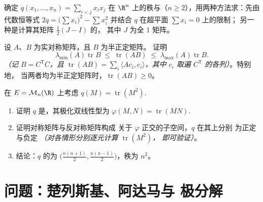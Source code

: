 \begin{exercise}[$\star\star$]\label{exo:b2:quadratic:10}
确定 $q(x_1, \dots, x_n) = \sum_{i <
j} x_ix_j$ 在 $\R^n$ 上的秩与（$n \geq 2$），用两种方法求：先由代数恒等式
$2q = \bigl(\sum x_i\bigr)^2 - \sum x_i^2$ 并结合
$q$ 在超平面 $\sum x_i = 0$ 上的限制；
另一种是计算其矩阵 $\frac12(J - I)$ 的，
其中 $J$ 为全 1 矩阵。
\end{exercise}

\begin{exercise}[$\star\star$]\label{exo:b2:quadratic:11}
设 $A$、$B$ 为实对称矩阵，且 $B$ 为半正定矩阵。
证明
\[
\lambda_{\min}(A)\operatorname{tr} B
\;\leq\;
\operatorname{tr}(AB)
\;\leq\;
\lambda_{\max}(A)\operatorname{tr} B .
\]
\emph{（记 $B = C^{\mathsf T}C$，且 $\operatorname{tr}(AB) =
\sum_i \langle A c_i, c_i\rangle$，其中 $c_i$ 取遍
$C^{\mathsf T}$ 的各列）}。特别地，
当两者均为半正定矩阵时，$\operatorname{tr}(AB) \geq 0$。
\end{exercise}

\begin{exercise}[$\star\star\star$]\label{exo:b2:quadratic:12}
在 $E = \mathcal{M}_n(\R)$ 上考虑 $q(M) =
\operatorname{tr}(M^2)$.
\begin{enumerate}
  \item 证明 $q$ 是，其极化双线性型为
        $\varphi(M, N) = \operatorname{tr}(MN)$.
  \item 证明对称矩阵与反对称矩阵构成
        关于 $\varphi$ 正交的子空间，$q$ 在其上分别
        为正定与负定
        \emph{（对各情形分别逐元计算 $\operatorname{tr}(M^2)$，
        即可验证）}。
  \item 结论：$q$ 的为 $\bigl(\frac{n(n+1)}{2},
        \frac{n(n-1)}{2}\bigr)$，秩为 $n^2$。
\end{enumerate}
\end{exercise}

\section{问题：楚列斯基、阿达马与
极分解}

